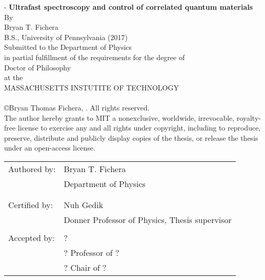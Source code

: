 \begin{titlingpage*}
\calccentering{\unitlength}
\begin{adjustwidth*}{\unitlength}{-\unitlength}
\centering
{\Large\bfseries Ultrafast spectroscopy and control of correlated quantum materials}\\[0.5\baselineskip]
{By}\\[0.5\baselineskip]
{\large Bryan T. Fichera\\[0.5\baselineskip]}
{B.S., University of Pennsylvania (2017)\\[0.5\baselineskip]
Submitted to the Department of Physics\\ in partial fulfillment of the requirements for the degree of\\[0.5\baselineskip]
{\large Doctor of Philosophy\\[0.5\baselineskip]}
at the\\[0.5\baselineskip]
{\large MASSACHUSETTS INSTUTITE OF TECHNOLOGY\\[0.5\baselineskip]}
\\[0.5\baselineskip]}
\copyright Bryan Thomas Fichera, . All rights reserved.\\[0.5\baselineskip]
The author hereby grants to MIT a nonexclusive, worldwide, irrevocable, royalty-free license to exercise any and all rights under copyright, including to reproduce, preserve, distribute and publicly display copies of the thesis, or release the thesis under an open-access license.\\[2\baselineskip]
\flushleft
\begin{tabularx}{\textwidth}{ll}
Authored by: & Bryan T. Fichera\\
& Department of Physics\\
& \\
\\
Certified by: & Nuh Gedik\\
& Donner Professor of Physics, Thesis supervisor\\
\\
Accepted by: & ?\\
& ? Professor of ?\\
& ? Chair of ?
\end{tabularx}
\end{adjustwidth*}
\end{titlingpage*}
